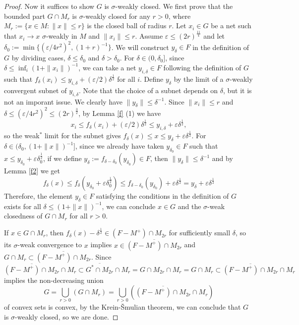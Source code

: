 \documentclass[noamsfonts,a4paper,10pt]{amsart}
\theoremstyle{plain}
\theoremstyle{definition}
\theoremstyle{remark}
\begin{document}
\begin{proof}
Now it suffices to show $G$ is $\sigma$-weakly closed.
We first prove that the bounded part $G\cap M_r$ is $\sigma$-weakly closed for any $r>0$, where $M_r:=\{x\in M:\|x\|\le r\}$ is the closed ball of radius $r$.
Let $x_i\in G$ be a net such that $x_i\to x$ $\sigma$-weakly in $M$ and $\|x_i\|\le r$.
Assume $\varepsilon\le(2r)^{\frac{11}4}$ and let $\delta_0:=\min\{(\varepsilon/4r^2)^2,(1+r)^{-1}\}$.
We will construct $y_\delta\in F$ in the definition of $G$ by dividing cases, $\delta\le\delta_0$ and $\delta>\delta_0$.
For $\delta\in(0,\delta_0]$, since $\delta\le\inf_i(1+\|x_i\|)^{-1}$, we can take a net $y_{i,\delta}\in F$ following the definition of $G$ such that $f_\delta(x_i)\le y_{i,\delta}+(\varepsilon/2)\delta^{\frac12}$ for all $i$.
Define $y_\delta$ by the limit of a $\sigma$-weakly convergent subnet of $y_{i,\delta}$.
Note that the choice of a subnet depends on $\delta$, but it is not an imporant issue.
We clearly have $\|y_\delta\|\le\delta^{-1}$.
Since $\|x_i\|\le r$ and $\delta\le(\varepsilon/4r^2)^2\le(2r)^{\frac32}$, by Lemma \ref{f} (1) we have
\[x_i\le f_\delta(x_i)+(\varepsilon/2)\delta^{\frac12}\le y_{i,\delta}+\varepsilon\delta^{\frac12},\]
so the weak$^*$ limit for the subnet gives $f_\delta(x)\le x\le y_\delta+\varepsilon\delta^{\frac12}$.
For $\delta\in(\delta_0,(1+\|x\|)^{-1}]$, since we already have taken $y_{\delta_0}\in F$ such that $x\le y_{\delta_0}+\varepsilon\delta_0^{\frac12}$, if we define $y_\delta:=f_{\delta-\delta_0}(y_{\delta_0})\in F$, then $\|y_\delta\|\le\delta^{-1}$ and by Lemma \ref{f2} we get
\[f_{\delta}(x)\le f_\delta(y_{\delta_0}+\varepsilon\delta_0^{\frac12})\le f_{\delta-\delta_0}(y_{\delta_0})+\varepsilon\delta^{\frac12}=y_\delta+\varepsilon\delta^{\frac12}\]
Therefore, the element $y_\delta\in F$ satisfying the conditions in the definition of $G$ exists for all $\delta\le(1+\|x\|)^{-1}$, we can conclude $x\in G$ and the $\sigma$-weak closedness of $G\cap M_r$ for all $r>0$.

If $x\in G\cap M_r$, then $f_\delta(x)-\delta^{\frac12}\in(F-M^+)\cap M_{2r}$ for sufficiently small $\delta$, so its $\sigma$-weak convergence to $x$ implies $x\in\overline{(F-M^+)\cap M_{2r}}$ and $G\cap M_r\subset\overline{(F-M^+)\cap M_{2r}}$.
Since
\[\overline{(F-M^+)\cap M_{2r}}\cap M_r\subset\overline{G^*\cap M_{2r}}\cap M_r=G\cap M_{2r}\cap M_r=G\cap M_r\subset\overline{(F-M^+)\cap M_{2r}}\cap M_r\]
implies the non-decreasing union
\[G=\bigcup_{r>0}(G\cap M_r)=\bigcup_{r>0}(\overline{(F-M^+)\cap M_{2r}}\cap M_r)\]
of convex sets is convex, by the Krein-\v Smulian theorem, we can conclude that $G$ is $\sigma$-weakly closed, so we are done.
\end{proof}
\end{document}

